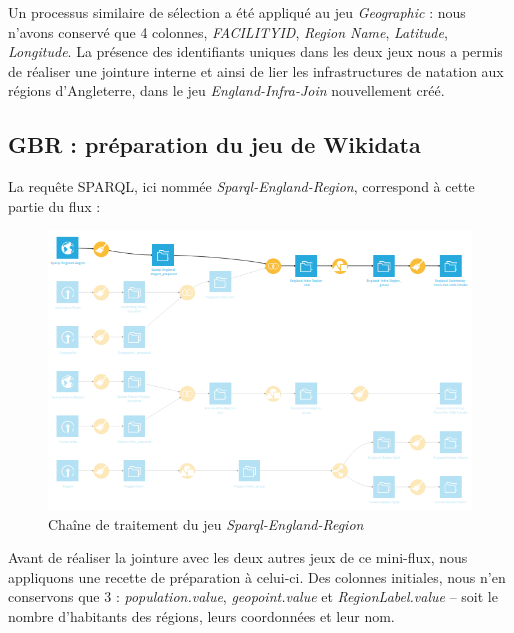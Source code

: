 \documentclass[hidelinks, 12pt]{report}
\begin{document}
Un processus similaire de sélection a été appliqué au jeu \textit{Geographic} : nous n'avons conservé que 4 colonnes, \textit{FACILITYID}, \textit{Region Name}, \textit{Latitude}, \textit{Longitude}. La présence des identifiants uniques dans les deux jeux nous a permis de réaliser une jointure interne et ainsi de lier les infrastructures de natation aux régions d'Angleterre, dans le jeu \textit{England-Infra-Join} nouvellement créé.





%





\subsection{GBR : préparation du jeu de Wikidata}

La requête SPARQL, ici nommée \textit{Sparql-England-Region}, correspond à cette partie du flux :

\begin{center}
	\begin{figure}[H]
		\setlength{\belowcaptionskip}{-35pt}
		\includegraphics[scale=0.55]{images/flow-swim-eng-sparql.png}
		\caption{Chaîne de traitement du jeu \textit{Sparql-England-Region}}
	\end{figure}
\end{center}

Avant de réaliser la jointure avec les deux autres jeux de ce mini-flux, nous appliquons une recette de préparation à celui-ci. Des colonnes initiales, nous n'en conservons que 3 : \textit{population.value}, \textit{geopoint.value} et \textit{RegionLabel.value} -- soit le nombre d'habitants des régions, leurs coordonnées et leur nom.
\end{document}
